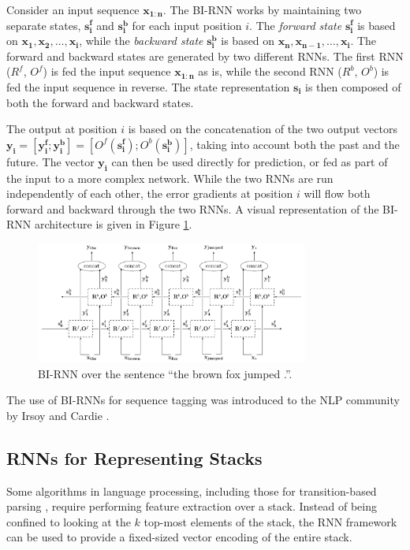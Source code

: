 \documentclass[jair,twoside,11pt,theapa]{article}
\newcommand{\m}[1]{\mathbf{#1}}%
\renewcommand{\shortcite}[0]{\citeyear}
\begin{document}
{Consider an input sequence $\m{x_{1:n}}$.
The BI-RNN works by maintaining two separate states, $\m{s^f_i}$ and $\m{s^b_i}$ for each input position $i$.
The \emph{forward state} $\m{s^f_i}$ is based on $\m{x_1},\m{x_2},\ldots,\m{x_i}$, while the
\emph{backward state} $\m{s^b_i}$ is based on $\m{x_n}, \m{x_{n-1}}, \ldots,\m{x_i}$.
The forward and backward states are generated by two different RNNs. The first
RNN ($R^f$, $O^f$)
is fed the input sequence $\m{x_{1:n}}$ as is, while the second RNN ($R^b$, $O^b$) is fed the
input sequence in reverse.
The state representation $\m{s_i}$ is then composed of both the forward and
backward states.

The output at position $i$ is based on the concatenation of the two output
vectors $\m{y_i} = [\m{y^f_i};\m{y^b_i}] = [O^f(\m{s^f_i});O^b(\m{s^b_i})]$,
taking into account both the past and the future. 
The vector $\m{y_i}$ can then be used directly for prediction, or fed as part of the
input to a more complex network.
While the two RNNs are run independently of each other, the error gradients at
position $i$ will flow both forward and backward through the two RNNs. A
visual
representation of the BI-RNN architecture is given in Figure \ref{fig:bi-rnn}.

\begin{figure}[ht]
    \begin{center}
    \includegraphics[width=0.8\textwidth]{bi-rnn.pdf} 
    \end{center}
    \caption{BI-RNN over the sentence ``the brown fox jumped .''.}
    \label{fig:bi-rnn}
\end{figure}

The use of BI-RNNs for sequence tagging was introduced to the NLP community by
Irsoy and Cardie \shortcite{irsoy2014opinion}.


\subsection{RNNs for Representing Stacks}

Some algorithms in language processing, including those for transition-based
parsing \cite{nivre2008algorithms}, require performing feature extraction over a
stack.  Instead of being confined to looking at the $k$ top-most elements of the
stack, the RNN framework can be used to provide a fixed-sized vector encoding of
the entire stack.

}
\end{document}
